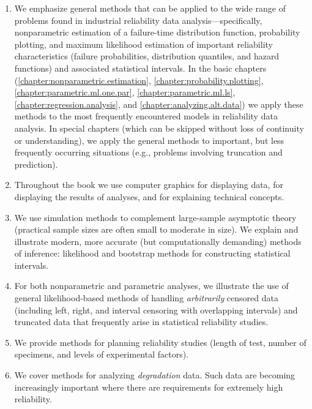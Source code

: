\begin{enumerate}
\item
We emphasize general methods that can be applied to the wide range of
problems found in industrial reliability data analysis---specifically,
nonparametric estimation of a failure-time distribution function,
probability plotting, and maximum likelihood estimation of important
reliability characteristics (failure probabilities, distribution
quantiles, and hazard functions) and associated statistical intervals.
In the basic chapters (\ref{chapter:nonparametric.estimation},
\ref{chapter:probability.plotting},
\ref{chapter:parametric.ml.one.par}, 
\ref{chapter:parametric.ml.ls}, 
\ref{chapter:regression.analysis}, and 
\ref{chapter:analyzing.alt.data})
we apply these methods to the most frequently encountered models in
reliability data analysis. In special chapters (which can be skipped
without loss of continuity or understanding), we apply the general
methods to important, but less frequently occurring situations
(e.g., problems involving truncation and prediction).

\item
Throughout the book we use computer graphics for displaying data,
for displaying the results of analyses, and for explaining technical
concepts.

\item 
We use simulation methods to complement large-sample asymptotic
theory (practical sample sizes are often small to moderate in size).
We explain and illustrate modern, more accurate (but computationally
demanding) methods of inference: likelihood and bootstrap methods
for constructing statistical intervals.

\item
For both nonparametric and parametric analyses, we illustrate the
use of general likelihood-based methods of handling {\em
arbitrarily} censored data (including left, right, and interval
censoring with overlapping intervals) and truncated data that
frequently arise in statistical reliability studies.

\item
We provide methods for planning reliability studies (length of test,
number of specimens, and levels of experimental factors).

\item
We cover methods for analyzing {\em degradation} data.
Such data are becoming increasingly important where there are
requirements for extremely high reliability.


\end{enumerate}
